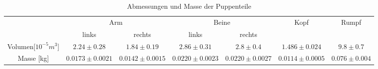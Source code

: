 \begin{table}[p]
	\centering
	\begin{tabular}{ccccccc}
	\toprule
	&\multicolumn{2}{c}{Arm} & \multicolumn{2}{c}{Beine}  & {Kopf} & {Rumpf}\\
	&{links} &{rechts} &{links} &{rechts} &{} & {}\\
	\midrule
	Volumen[$10^{-5}m^3$]&$2.24 \pm0.28$ &$1.84 \pm0.19$&$2.86 \pm0.31 $&$2.8 \pm0.4 $&$1.486 \pm0.024$ &$9.8 \pm0.7$\\
	Masse [kg] &$0.0173 \pm0.0021$&$0.0142 \pm0.0015$&$0.0220 \pm0.0023$&$0.0220 \pm0.0027$&$0.0114 \pm0.0005$&$0.076 \pm0.004$\\
	\bottomrule
	\end{tabular}
	\caption{Abmessungen und Masse der Puppenteile}
	\label{tab:M6 Puppenteile}	

\end{table}
